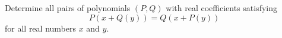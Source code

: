 Determine all pairs of polynomials $(P, Q)$ with real coefficients satisfying$$P(x + Q(y)) = Q(x + P(y))$$for all real numbers $x$ and $y$.